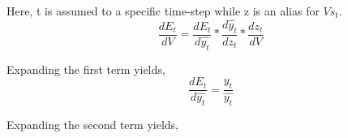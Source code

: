 \documentclass[10pt,onecolumn]{IEEEtran}
\begin{document}
Here, t is assumed to a specific time-step while z is an alias for $Vs_t$.
\begin{equation}
\frac{dE_t}{dV} = \frac{dE_t}{d\hat{y_t}}*\frac{d\hat{y_t}}{dz_t}*\frac{dz_t}{dV} 
\end{equation}


Expanding the first term yields,
\begin{equation}
\frac{dE_t}{d\hat{y_t}} = \frac{y_t}{\hat{y_t}}
\end{equation}

Expanding the second term yields,
\begin{align*}

\end{align*}



\end{document}
